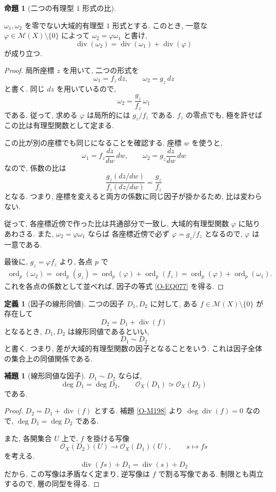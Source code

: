 \documentclass[dvipdfmx,a4paper,11pt]{article} %
\theoremstyle{definition}
\numberwithin{equation}{section}
\newtheorem{lem}[thm]{補題}
\newtheorem{prop}[thm]{命題}
\newtheorem{dfn}[thm]{定義}
\begin{document}
\begin{prop}[二つの有理型 $1$ 形式の比]\label{O-M282}

$\omega_1,\omega_2$ を零でない大域的有理型 $1$ 形式とする.
このとき, 一意な $\varphi\in\mathcal M(X)\setminus\{0\}$ によって $\omega_2=\varphi\omega_1$ と書け, 
\begin{equation}\label{O-EQ077}
\operatorname{div}(\omega_2)
=\operatorname{div}(\omega_1)+\operatorname{div}(\varphi)
\end{equation}
が成り立つ.
\end{prop}
\begin{proof}
局所座標 $z$ を用いて, 二つの形式を
\[
\omega_1=f_z\,dz,\qquad \omega_2=g_z\,dz
\]
と書く.
同じ $dz$ を用いているので,
\[
\omega_2=\frac{g_z}{f_z}\,\omega_1
\]
である.
従って, 求める $\varphi$ は局所的には $g_z/f_z$ である.
$f_z$ の零点でも, 極を許せばこの比は有理型関数として定まる.

この比が別の座標でも同じになることを確認する.
座標 $w$ を使うと,
\[
\omega_1=f_z\frac{dz}{dw}\,dw,\qquad
\omega_2=g_z\frac{dz}{dw}\,dw
\]
なので, 係数の比は
\[
\frac{g_z(dz/dw)}{f_z(dz/dw)}
=\frac{g_z}{f_z}
\]
となる.
つまり, 座標を変えると両方の係数に同じ因子が掛かるため,
比は変わらない.

従って, 各座標近傍で作った比は共通部分で一致し,
大域的有理型関数 $\varphi$ に貼りあわさる.
また, $\omega_2=\varphi\omega_1$ ならば
各座標近傍で必ず $\varphi=g_z/f_z$ となるので,
$\varphi$ は一意である.

最後に, $g_z=\varphi f_z$ より, 各点 $p$ で
\[
\begin{aligned}
\operatorname{ord}_p(\omega_2)
=\operatorname{ord}_p(g_z)
=\operatorname{ord}_p(\varphi)+\operatorname{ord}_p(f_z)=\operatorname{ord}_p(\varphi)+\operatorname{ord}_p(\omega_1).
\end{aligned}
\]
これを各点の係数として並べれば,
因子の等式 \eqref{O-EQ077} を得る.
\end{proof}

\begin{dfn}[因子の線形同値]\label{O-M283}
二つの因子 $D_1,D_2$ に対して, 
ある $f\in\mathcal M(X)\setminus\{0\}$ が存在して
\[
D_2=D_1+\operatorname{div}(f)
\]
となるとき, $D_1,D_2$ は線形同値であるといい, 
\[
D_1\sim D_2
\]
と書く.
つまり, 差が大域的有理型関数の因子となることをいう.
これは因子全体の集合上の同値関係である.
\end{dfn}


\begin{lem}[線形同値な因子]\label{O-M284}
$D_1\sim D_2$ ならば,
\[
\deg D_1=\deg D_2,\qquad \mathcal O_X(D_1)\simeq\mathcal O_X(D_2)
\]
である.
\end{lem}
\begin{proof}
$D_2=D_1+\operatorname{div}(f)$ とする.
補題 \ref{O-M198} より $\deg\operatorname{div}(f)=0$ なので, 
$\deg D_1=\deg D_2$ である.

また, 各開集合 $U$ 上で, $f$ を掛ける写像
\[
\mathcal O_X(D_2)(U)\longrightarrow\mathcal O_X(D_1)(U),
\qquad s\longmapsto fs
\]
を考える.
\[
\operatorname{div}(fs)+D_1
=\operatorname{div}(s)+D_2
\]
だから, この写像は矛盾なく定まり, 
逆写像は $f$ で割る写像である.
制限とも両立するので, 層の同型を得る.

\end{proof}
\end{document}
